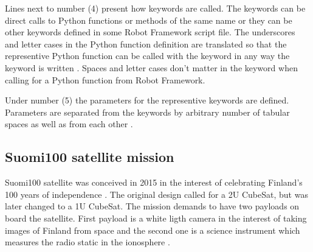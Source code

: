 \documentclass[english,12pt,a4paper,pdftex,elec,utf8]{aaltothesis}
\begin{document}
Lines next to number (4) present how keywords are called. The keywords can be direct calls to Python functions or methods of the same name or they can be other keywords defined in some Robot Framework script file. The underscores and letter cases in the Python function definition are translated so that the representive Python function can be called with the keyword in any way the keyword is written \cite{robotuserguide}. Spaces and letter cases don't matter in the keyword when calling for a Python function from Robot Framework.\par 
Under number (5) the parameters for the representive keywords are defined. Parameters are separated from the keywords by arbitrary number of tabular spaces as well as from each other \cite{robotuserguide}.\par
\subsection{Suomi100 satellite mission}
Suomi100 satellite was conceived in 2015 in the interest of celebrating Finland's 100 years of independence \cite{s1002015}. The original design called for a 2U CubeSat, but was later changed to a 1U CubeSat. The mission demands to have two payloads on board the satellite. First payload is a white ligth camera in the interest of taking images of Finland from space and the second one is a science instrument which measures the radio static in the ionosphere \cite{s1002015, s100blogi}.\par
\end{document}
